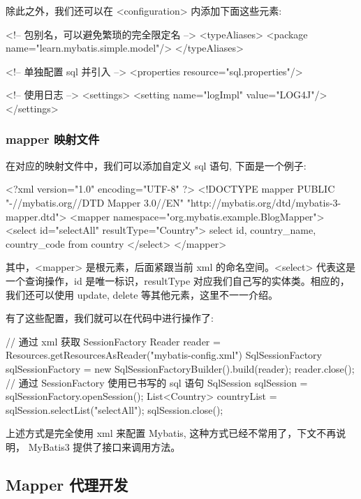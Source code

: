 除此之外，我们还可以在 <configuration> 内添加下面这些元素:

\begin{xml}
<!-- 包别名，可以避免繁琐的完全限定名 -->
<typeAliases>
    <package name="learn.mybatis.simple.model"/>
</typeAliases>

<!-- 单独配置 sql 并引入 -->
<properties resource="sql.properties"/>

<!-- 使用日志 -->
<settings>
    <setting name="logImpl" value="LOG4J"/>
</settings>
\end{xml}

\subsubsection{mapper 映射文件}

在对应的映射文件中，我们可以添加自定义 sql 语句, 下面是一个例子:

\begin{xml}
<?xml version="1.0" encoding="UTF-8" ?>
<!DOCTYPE mapper PUBLIC "-//mybatis.org//DTD Mapper 3.0//EN"
        "http://mybatis.org/dtd/mybatis-3-mapper.dtd">
<mapper namespace="org.mybatis.example.BlogMapper">
    <select id="selectAll" resultType="Country">
        select id, country_name, country_code from country
    </select>
</mapper>
\end{xml}

其中，<mapper> 是根元素，后面紧跟当前 xml 的命名空间。<select> 代表这是一个查询操作，id 是唯一标识，resultType 对应我们自己写的实体类。相应的，我们还可以使用 update, delete 等其他元素，这里不一一介绍。

有了这些配置，我们就可以在代码中进行操作了:

\begin{Java}
// 通过 xml 获取 SessionFactory
Reader reader = Resources.getResourcesAsReader("mybatis-config.xml")
SqlSessionFactory sqlSessionFactory = new SqlSessionFactoryBuilder().build(reader);
reader.close();
// 通过 SessionFactory 使用已书写的 sql 语句
SqlSession sqlSession = sqlSessionFactory.openSession();
List<Country> countryList = sqlSession.selectList("selectAll");
sqlSession.close();
\end{Java}

上述方式是完全使用 xml 来配置 Mybatis, 这种方式已经不常用了，下文不再说明， MyBatis3 提供了接口来调用方法。

\subsection{Mapper 代理开发}

